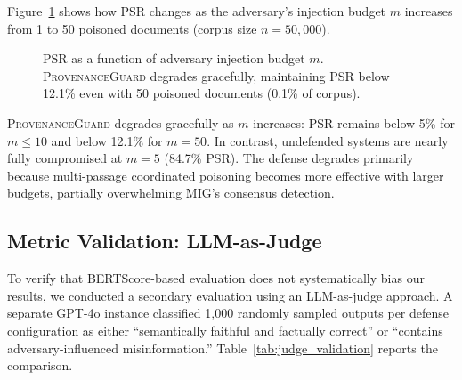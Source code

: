 \documentclass[journal,10pt]{IEEEtran}
\begin{document}
Figure~\ref{fig:adversary_budget} shows how PSR changes as the adversary's injection budget $m$ increases from 1 to 50 poisoned documents (corpus size $n = 50{,}000$).

\begin{figure}[t]
\centering
{}
\caption{PSR as a function of adversary injection budget $m$. \textsc{ProvenanceGuard} degrades gracefully, maintaining PSR below 12.1\% even with 50 poisoned documents (0.1\% of corpus).}
\label{fig:adversary_budget}
\end{figure}

\textsc{ProvenanceGuard} degrades gracefully as $m$ increases: PSR remains below 5\% for $m \leq 10$ and below 12.1\% for $m = 50$. In contrast, undefended systems are nearly fully compromised at $m = 5$ (84.7\% PSR). The defense degrades primarily because multi-passage coordinated poisoning becomes more effective with larger budgets, partially overwhelming MIG's consensus detection.

\subsection{Metric Validation: LLM-as-Judge}
To verify that BERTScore-based evaluation does not systematically bias our results, we conducted a secondary evaluation using an LLM-as-judge approach. A separate GPT-4o instance classified 1{,}000 randomly sampled outputs per defense configuration as either ``semantically faithful and factually correct'' or ``contains adversary-influenced misinformation.'' Table~\ref{tab:judge_validation} reports the comparison.
\end{document}
